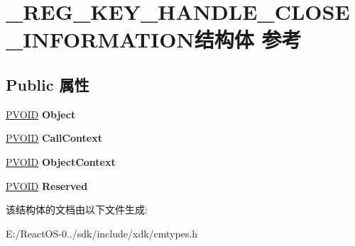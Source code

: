 \hypertarget{struct___r_e_g___k_e_y___h_a_n_d_l_e___c_l_o_s_e___i_n_f_o_r_m_a_t_i_o_n}{}\section{\+\_\+\+R\+E\+G\+\_\+\+K\+E\+Y\+\_\+\+H\+A\+N\+D\+L\+E\+\_\+\+C\+L\+O\+S\+E\+\_\+\+I\+N\+F\+O\+R\+M\+A\+T\+I\+O\+N结构体 参考}
\label{struct___r_e_g___k_e_y___h_a_n_d_l_e___c_l_o_s_e___i_n_f_o_r_m_a_t_i_o_n}
\subsection*{Public 属性}
\begin{DoxyCompactItemize}
\item 
\mbox{\label{struct___r_e_g___k_e_y___h_a_n_d_l_e___c_l_o_s_e___i_n_f_o_r_m_a_t_i_o_n_a645bc3092fbf5843351e0d7e1339acd7}} 
\hyperlink{interfacevoid}{P\+V\+O\+ID} {\bfseries Object}
\item 
\mbox{\label{struct___r_e_g___k_e_y___h_a_n_d_l_e___c_l_o_s_e___i_n_f_o_r_m_a_t_i_o_n_a19d6be54a02d07f0e1750a843f3be82f}} 
\hyperlink{interfacevoid}{P\+V\+O\+ID} {\bfseries Call\+Context}
\item 
\mbox{\label{struct___r_e_g___k_e_y___h_a_n_d_l_e___c_l_o_s_e___i_n_f_o_r_m_a_t_i_o_n_a6412154542d6433ff05a552d3d6e9d8a}} 
\hyperlink{interfacevoid}{P\+V\+O\+ID} {\bfseries Object\+Context}
\item 
\mbox{\label{struct___r_e_g___k_e_y___h_a_n_d_l_e___c_l_o_s_e___i_n_f_o_r_m_a_t_i_o_n_a1fa751c9755d6880dc62bd126ae2ee0e}} 
\hyperlink{interfacevoid}{P\+V\+O\+ID} {\bfseries Reserved}
\end{DoxyCompactItemize}


该结构体的文档由以下文件生成\+:\begin{DoxyCompactItemize}
\item 
E\+:/\+React\+O\+S-\/0../sdk/include/xdk/cmtypes.\+h\end{DoxyCompactItemize}
